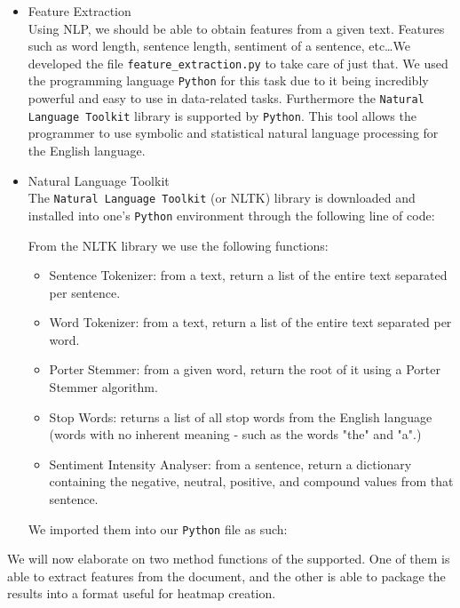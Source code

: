 \documentclass[runningheads]{llncs}
\begin{document}
\begin{itemize}
    \item Feature Extraction \\
    Using NLP, we should be able to obtain features from a given text. Features such as word length, sentence length, sentiment of a sentence, etc\ldots We developed the file \texttt{feature\_extraction.py} to take care of just that. We used the programming language \texttt{Python} for this task due to it being incredibly powerful and easy to use in data-related tasks. Furthermore the \texttt{Natural Language Toolkit} library is supported by \texttt{Python}. This tool allows the programmer to use symbolic and statistical natural language processing for the English language.
    \item Natural Language Toolkit \\
    The \texttt{Natural Language Toolkit} (or NLTK) library is downloaded and installed into one's \texttt{Python} environment through the following line of code:
    
    From the NLTK library we use the following functions:
    \begin{itemize}
        \item Sentence Tokenizer: from a text, return a list of the entire text separated per sentence.
        \item Word Tokenizer: from a text, return a list of the entire text separated per word.
        \item Porter Stemmer: from a given word, return the root of it using a Porter Stemmer algorithm.
        \item Stop Words: returns a list of all stop words from the English language (words with no inherent meaning - such as the words "the" and "a".)
        \item Sentiment Intensity Analyser: from a sentence, return a dictionary containing the negative, neutral, positive, and compound values from that sentence.
    \end{itemize}
    We imported them into our \texttt{Python} file as such:
    
\end{itemize}
We will now elaborate on two method functions of the supported. One of them is able to extract features from the document, and the other is able to package the results into a format useful for heatmap creation.
%
\end{document}
